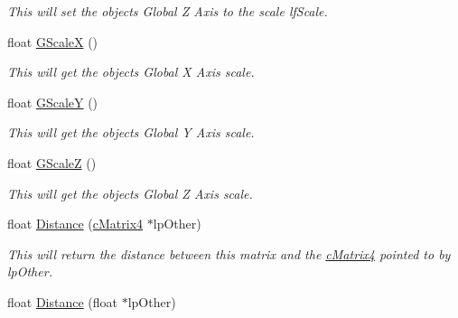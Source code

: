 \begin{DoxyCompactItemize}
\begin{DoxyCompactList}\small\item\em This will set the objects Global Z Axis to the scale lfScale. \end{DoxyCompactList}\item 
\hypertarget{classc_matrix4_a74c4a8cd7539f99ba2d5c8c98f757748}{
float \hyperlink{classc_matrix4_a74c4a8cd7539f99ba2d5c8c98f757748}{GScaleX} ()}
\label{classc_matrix4_a74c4a8cd7539f99ba2d5c8c98f757748}

\begin{DoxyCompactList}\small\item\em This will get the objects Global X Axis scale. \end{DoxyCompactList}\item 
\hypertarget{classc_matrix4_aa9493e86b746ba33d0135d4adcf74b3e}{
float \hyperlink{classc_matrix4_aa9493e86b746ba33d0135d4adcf74b3e}{GScaleY} ()}
\label{classc_matrix4_aa9493e86b746ba33d0135d4adcf74b3e}

\begin{DoxyCompactList}\small\item\em This will get the objects Global Y Axis scale. \end{DoxyCompactList}\item 
\hypertarget{classc_matrix4_af5ad4a4ea96eb13c9c12b6edfa1f96c2}{
float \hyperlink{classc_matrix4_af5ad4a4ea96eb13c9c12b6edfa1f96c2}{GScaleZ} ()}
\label{classc_matrix4_af5ad4a4ea96eb13c9c12b6edfa1f96c2}

\begin{DoxyCompactList}\small\item\em This will get the objects Global Z Axis scale. \end{DoxyCompactList}\item 
\hypertarget{classc_matrix4_acd04bb06d1d12807b203b0aaf9e9b608}{
float \hyperlink{classc_matrix4_acd04bb06d1d12807b203b0aaf9e9b608}{Distance} (\hyperlink{classc_matrix4}{cMatrix4} $\ast$lpOther)}
\label{classc_matrix4_acd04bb06d1d12807b203b0aaf9e9b608}

\begin{DoxyCompactList}\small\item\em This will return the distance between this matrix and the \hyperlink{classc_matrix4}{cMatrix4} pointed to by lpOther. \end{DoxyCompactList}\item 
\hypertarget{classc_matrix4_a83fd4655f67a81cb42f3c50262ec593e}{
float \hyperlink{classc_matrix4_a83fd4655f67a81cb42f3c50262ec593e}{Distance} (float $\ast$lpOther)}
\label{classc_matrix4_a83fd4655f67a81cb42f3c50262ec593e}


\end{DoxyCompactItemize}
